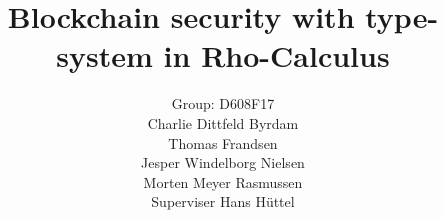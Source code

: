 \mainmatter  %

\title{Blockchain security with type-system in Rho-Calculus}




\author{Group: D608F17\\Charlie Dittfeld Byrdam\\Thomas Frandsen\\Jesper Windelborg Nielsen\\Morten Meyer Rasmussen\\Superviser Hans Hüttel}




\toctitle{}
\tocauthor{}
\maketitle

\begin{abstract}

\end{abstract}
